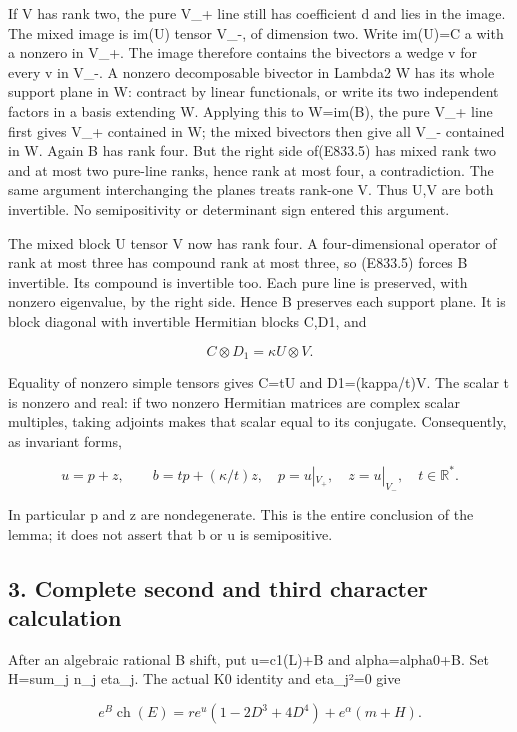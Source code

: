 If V has rank two, the pure V\_+ line still has coefficient d and lies
in the image. The mixed image is im(U) tensor V\_-, of dimension two.
Write im(U)=C a with a nonzero in V\_+. The image therefore contains the
bivectors a wedge v for every v in V\_-. A nonzero decomposable bivector
in Lambda2 W has its whole support plane in W: contract by linear
functionals, or write its two independent factors in a basis extending
W. Applying this to W=im(B), the pure V\_+ line first gives V\_+
contained in W; the mixed bivectors then give all V\_- contained in W.
Again B has rank four. But the right side of(E833.5) has mixed rank two
and at most two pure-line ranks, hence rank at most four, a
contradiction. The same argument interchanging the planes treats
rank-one V. Thus U,V are both invertible. No semipositivity or
determinant sign entered this argument.

The mixed block U tensor V now has rank four. A four-dimensional
operator of rank at most three has compound rank at most three, so
(E833.5) forces B invertible. Its compound is invertible too. Each pure
line is preserved, with nonzero eigenvalue, by the right side. Hence B
preserves each support plane. It is block diagonal with invertible
Hermitian blocks C,D1, and

\[
 C\otimes D_1=\kappa U\otimes V.
 \tag{E833.6}
\]

Equality of nonzero simple tensors gives C=tU and D1=(kappa/t)V. The
scalar t is nonzero and real: if two nonzero Hermitian matrices are
complex scalar multiples, taking adjoints makes that scalar equal to its
conjugate. Consequently, as invariant forms,

\[
 u=p+z,\qquad b=t p+(\kappa/t)z,
 \quad p=u|_{V_+},\quad z=u|_{V_-},\quad t\in\mathbb R^*.
 \tag{E833.7}
\]

In particular p and z are nondegenerate. This is the entire conclusion
of the lemma; it does not assert that b or u is semipositive.

\subsection{3. Complete second and third character
calculation}\label{SF-E833:complete-second-and-third-character-calculation}

After an algebraic rational B shift, put u=c1(L)+B and alpha=alpha0+B.
Set H=sum\_j n\_j eta\_j. The actual K0 identity and eta\_j²=0 give

\[
 e^B\operatorname{ch}(E)
  =r e^u(1-2D^3+4D^4)+e^\alpha(m+H).
 \tag{E833.8}
\]

